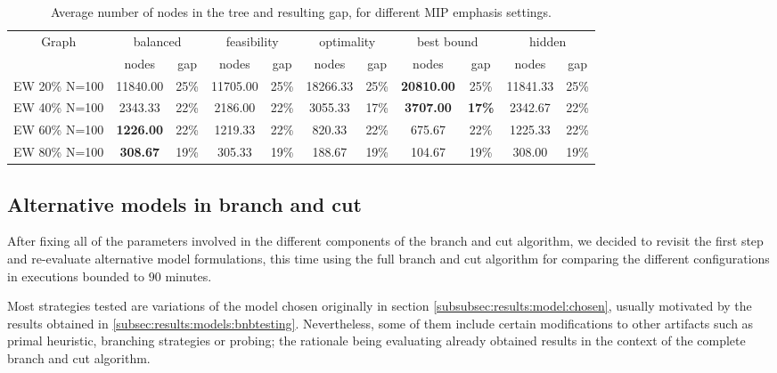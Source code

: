\begin{sidewaystable}[h]
\centering

\begin{tabular}{|c|cc|cc|cc|cc|cc|}
\hline
\multicolumn{1}{|c|}{Graph} & \multicolumn{2}{|c|}{balanced} & \multicolumn{2}{|c|}{feasibility} & \multicolumn{2}{|c|}{optimality} & \multicolumn{2}{|c|}{best bound} & \multicolumn{2}{|c|}{hidden}
\\
 & nodes & gap & nodes & gap & nodes & gap & nodes & gap & nodes & gap
\\
\hline
EW 20\% N=100 & 11840.00 &25\% & 11705.00 &25\% & 18266.33 &25\% & \textbf{20810.00} &25\% & 11841.33 &25\%
\\
EW 40\% N=100 & 2343.33 &22\% & 2186.00 &22\% & 3055.33 &17\% & \textbf{3707.00} & \textbf{17\%} & 2342.67 &22\%
\\
EW 60\% N=100 & \textbf{1226.00} &22\% & 1219.33 &22\% & 820.33 &22\% & 675.67 &22\% & 1225.33 &22\%
\\
EW 80\% N=100 & \textbf{308.67} &19\% & 305.33 &19\% & 188.67 &19\% & 104.67 &19\% & 308.00 &19\%
\\
\hline 
\end{tabular}

\caption{Average number of nodes in the tree and resulting gap, for different MIP emphasis settings.}
\label{table:bnc:emph}

\end{sidewaystable}

\clearpage

\subsection{Alternative models in branch and cut}

After fixing all of the parameters involved in the different components of the branch and cut algorithm, we decided to revisit the first step and re-evaluate alternative model formulations, this time using the full branch and cut algorithm for comparing the different configurations in executions bounded to $90$ minutes.

Most strategies tested are variations of the model chosen originally in section \ref{subsubsec:results:model:chosen}, usually motivated by the results obtained in \ref{subsec:results:models:bnbtesting}. Nevertheless, some of them include certain modifications to other artifacts such as primal heuristic, branching strategies or probing; the rationale being evaluating already obtained results in the context of the complete branch and cut algorithm.

